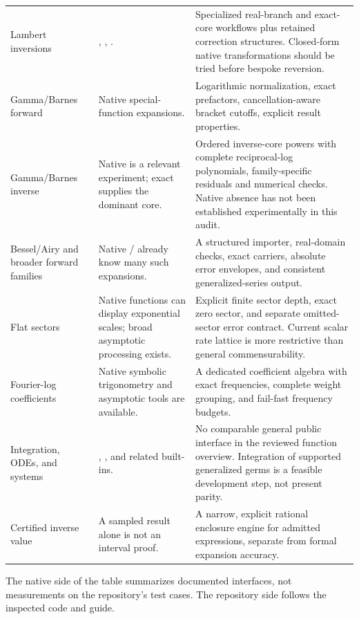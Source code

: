 \documentclass[11pt,letterpaper]{article}
\newcommand{\code}[1]{\texttt{\small\detokenize{#1}}}
\begin{document}
\begin{longtable}{@{}p{}p{}p{}@{}}
Lambert inversions & \code{ProductLog}, \code{InverseFunction}, \code{AsymptoticSolve}. & Specialized real-branch and exact-core workflows plus retained correction structures. Closed-form native transformations should be tried before bespoke reversion.\\[6pt]
Gamma/Barnes forward & Native special-function expansions. & Logarithmic normalization, exact prefactors, cancellation-aware bracket cutoffs, explicit result properties.\\[6pt]
Gamma/Barnes inverse & Native \code{AsymptoticSolve} is a relevant experiment; exact \code{ProductLog} supplies the dominant core. & Ordered inverse-core powers with complete reciprocal-log polynomials, family-specific residuals and numerical checks. Native absence has not been established experimentally in this audit.\\[6pt]
Bessel/Airy and broader forward families & Native \code{Series}/\code{Asymptotic} already know many such expansions. & A structured importer, real-domain checks, exact carriers, absolute error envelopes, and consistent generalized-series output.\\[6pt]
Flat sectors & Native functions can display exponential scales; broad asymptotic processing exists. & Explicit finite sector depth, exact zero sector, and separate omitted-sector error contract. Current scalar rate lattice is more restrictive than general commensurability.\\[6pt]
Fourier-log coefficients & Native symbolic trigonometry and asymptotic tools are available. & A dedicated coefficient algebra with exact frequencies, complete weight grouping, and fail-fast frequency budgets.\\[6pt]
Integration, ODEs, and systems & \code{AsymptoticIntegrate}, \code{AsymptoticDSolveValue}, and related built-ins. & No comparable general public interface in the reviewed function overview. Integration of supported generalized germs is a feasible development step, not present parity.\\[6pt]
Certified inverse value & A sampled \code{FindRoot} result alone is not an interval proof. & A narrow, explicit rational enclosure engine for admitted expressions, separate from formal expansion accuracy.\\
\bottomrule
\end{longtable}
The native side of the table summarizes documented interfaces, not measurements on the repository's test cases. The repository side follows the inspected code and guide.\cite{wl-series,wl-seriesdata,wl-inverseseries,wl-composeseries,wl-asymptotic,wl-asymptoticsolve,wl-integrate,wl-dsolve,wl-productlog,repo-guide}
\end{document}
